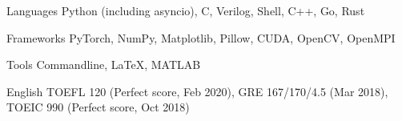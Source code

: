 

\begin{cvskills}

  \cvskill
    {Languages} %
    {Python (including asyncio), C, Verilog, Shell, C++, Go, Rust} %

  \cvskill
    {Frameworks} %
    {PyTorch, NumPy, Matplotlib, Pillow, CUDA, OpenCV, OpenMPI} %

  \cvskill
    {Tools} %
    {Commandline, LaTeX, MATLAB} %

  \cvskill
    {English} %
    {TOEFL 120 (Perfect score, Feb 2020), GRE 167/170/4.5 (Mar 2018), TOEIC 990 (Perfect score, Oct 2018)} %

\end{cvskills}

